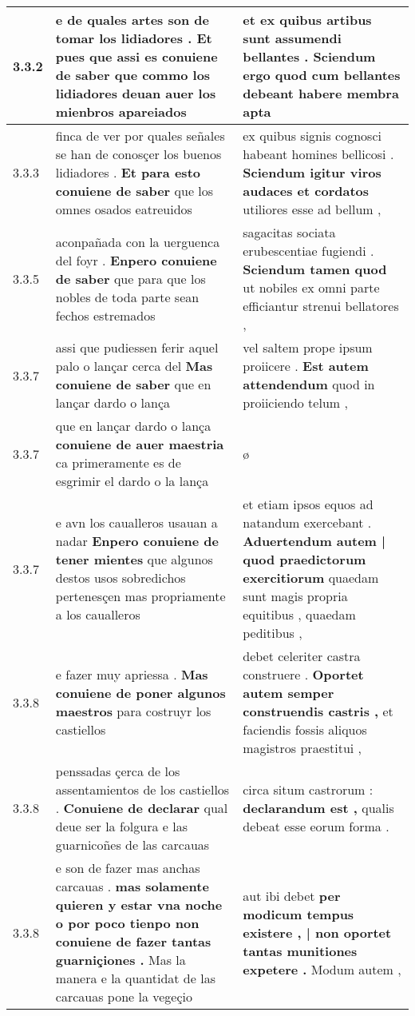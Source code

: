 \begin{tabular}{|p{1cm}|p{6.5cm}|p{6.5cm}|}
3.3.2 & e de quales artes son de tomar los lidiadores . \textbf{ Et pues que assi es conuiene de saber } que commo los lidiadores deuan auer los mienbros apareiados & et ex quibus artibus sunt assumendi bellantes . \textbf{ Sciendum ergo quod cum bellantes debeant } habere membra apta \\\hline
3.3.3 & finca de ver por quales señales se han de conosçer los buenos lidiadores . \textbf{ Et para esto conuiene de saber } que los omnes osados eatreuidos & ex quibus signis cognosci habeant homines bellicosi . \textbf{ Sciendum igitur viros audaces et cordatos } utiliores esse ad bellum , \\\hline
3.3.5 & aconpañada con la uerguenca del foyr . \textbf{ Enpero conuiene de saber } que para que los nobles de toda parte sean fechos estremados & sagacitas sociata erubescentiae fugiendi . \textbf{ Sciendum tamen quod } ut nobiles ex omni parte efficiantur strenui bellatores , \\\hline
3.3.7 & assi que pudiessen ferir aquel palo o lançar cerca del \textbf{ Mas conuiene de saber } que en lançar dardo o lança & vel saltem prope ipsum proiicere . \textbf{ Est autem attendendum } quod in proiiciendo telum , \\\hline
3.3.7 & que en lançar dardo o lança \textbf{ conuiene de auer maestria } ca primeramente es de esgrimir el dardo o la lança & ø \\\hline
3.3.7 & e avn los caualleros usauan a nadar \textbf{ Enpero conuiene de tener mientes } que algunos destos usos sobredichos pertenesçen mas propriamente a los caualleros & et etiam ipsos equos ad natandum exercebant . \textbf{ Aduertendum autem | quod praedictorum exercitiorum } quaedam sunt magis propria equitibus , quaedam peditibus , \\\hline
3.3.8 & e fazer muy apriessa . \textbf{ Mas conuiene de poner algunos maestros } para costruyr los castiellos & debet celeriter castra construere . \textbf{ Oportet autem semper construendis castris , } et faciendis fossis aliquos magistros praestitui , \\\hline
3.3.8 & penssadas çerca de los assentamientos de los castiellos . \textbf{ Conuiene de declarar } qual deue ser la folgura e las guarnicoñes de las carcauas & circa situm castrorum : \textbf{ declarandum est , } qualis debeat esse eorum forma . \\\hline
3.3.8 & e son de fazer mas anchas carcauas . \textbf{ mas solamente quieren y estar vna noche o por poco tienpo non conuiene de fazer tantas guarniçiones . } Mas la manera e la quantidat de las carcauas pone la vegeçio & aut ibi debet \textbf{ per modicum tempus existere , | non oportet tantas munitiones expetere . } Modum autem , \\\hline

\end{tabular}
